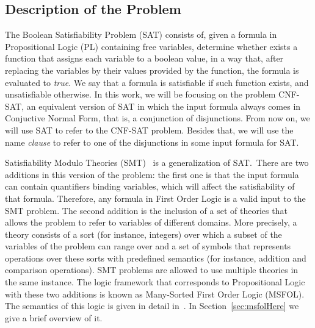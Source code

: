 \subsection{Description of the Problem}

The Boolean Satisfiability Problem (SAT) consists of, given a formula in Propositional Logic (PL) containing free variables, determine whether exists a function that assigns each variable to a boolean value, in a way that, after replacing the variables by their values provided by the function, the formula is evaluated to \textit{true}. We say that a formula is satisfiable if such function exists, and unsatisfiable otherwise. In this work, we will be focusing on the problem CNF-SAT, an equivalent version of SAT in which the input formula always comes in Conjuctive Normal Form, that is, a conjunction of disjunctions. From now on, we will use SAT to refer to the CNF-SAT problem. Besides that, we will use the name \textit{clause} to refer to one of the disjunctions in some input formula for SAT.

Satisfiability Modulo Theories (SMT)~\cite{smt} is a generalization of SAT.\ There are two additions in this version of the problem: the first one is that the input formula can contain quantifiers binding variables, which will affect the satisfiability of that formula. Therefore, any formula in First Order Logic is a valid input to the SMT problem. The second addition is the inclusion of a set of theories that allows the problem to refer to variables of different domains. More precisely, a theory consists of a sort (for instance, integers) over which a subset of the variables of the problem can range over and a set of symbols that represents operations over these sorts with predefined semantics (for instance, addition and comparison operations). SMT problems are allowed to use multiple theories in the same instance. The logic framework that corresponds to Propositional Logic with these two additions is known as Many-Sorted First Order Logic (MSFOL). The semantics of this logic is given in detail in~\cite{many_sorted}. In Section~\ref{sec:msfolHere} we give a brief overview of it.




